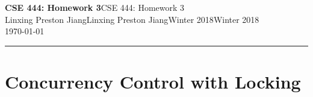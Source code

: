 \documentclass[10pt]{myland}
\newcommand{\myname}{Linxing Preston Jiang}
\newcommand{\quarter}{Winter 2018}
\newcommand{\myhwname}{\textbf{CSE 444: Homework 3}}
\begin{document}
\begin{center}
	{\Large \myhwname{CSE 444: Homework 3}} \\
	\vspace{.05in}
    \myname{Linxing Preston Jiang}\quad\quarter{Winter 2018}\\
	\vspace{.05in}
    \today \\
\end{center}
\vspace{.15in} \hrule \vspace{0.5em}%

\section{Concurrency Control with Locking}
\end{document}
